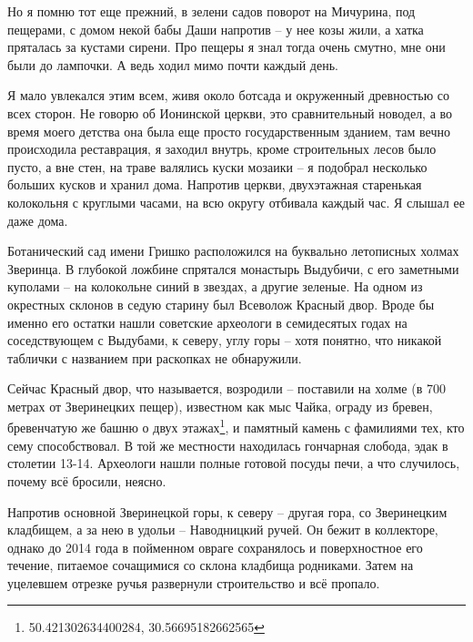 Но я помню тот еще прежний, в зелени садов поворот на Мичурина, под пещерами, с домом некой бабы Даши напротив – у нее козы жили, а хатка пряталась за кустами сирени. Про пещеры я знал тогда очень смутно, мне они были до лампочки. А ведь ходил мимо почти каждый день.

Я мало увлекался этим всем, живя около ботсада и окруженный древностью со всех сторон. Не говорю об Ионинской церкви, это сравнительный новодел, а во время моего детства она была еще просто государственным зданием, там вечно происходила реставрация, я заходил внутрь, кроме строительных лесов было пусто, а вне стен, на траве валялись куски мозаики – я подобрал несколько больших кусков и хранил дома. Напротив церкви, двухэтажная старенькая колокольня с круглыми часами, на всю округу отбивала каждый час. Я слышал ее даже дома.

Ботанический сад имени Гришко расположился на буквально летописных холмах Зверинца. В глубокой ложбине спрятался монастырь Выдубичи, с его заметными куполами – на колокольне синий в звездах, а другие зеленые. На одном из окрестных склонов в седую старину был Всеволож Красный двор. Вроде бы именно его остатки нашли советские археологи в семидесятых годах на соседствующем с Выдубами, к северу, углу горы – хотя понятно, что никакой таблички с названием при раскопках не обнаружили.%

Сейчас Красный двор, что называется, возродили – поставили на холме (в 700 метрах от Зверинецких пещер), известном как мыс Чайка,  ограду из бревен, бревенчатую же башню о двух этажах\footnote{50.421302634400284, 30.56695182662565}, и памятный камень с фамилиями тех, кто сему способствовал. В той же местности находилась гончарная слобода, эдак в столетии 13-14. Археологи нашли полные готовой посуды печи, а что случилось, почему всё бросили, неясно.

Напротив основной Зверинецкой горы, к северу – другая гора, со Зверинецким кладбищем, а за нею в удольи – Наводницкий ручей. Он бежит в коллекторе, однако до 2014 года в пойменном овраге сохранялось и поверхностное его течение, питаемое сочащимися со склона кладбища родниками. Затем на уцелевшем отрезке ручья развернули строительство и всё пропало. 


